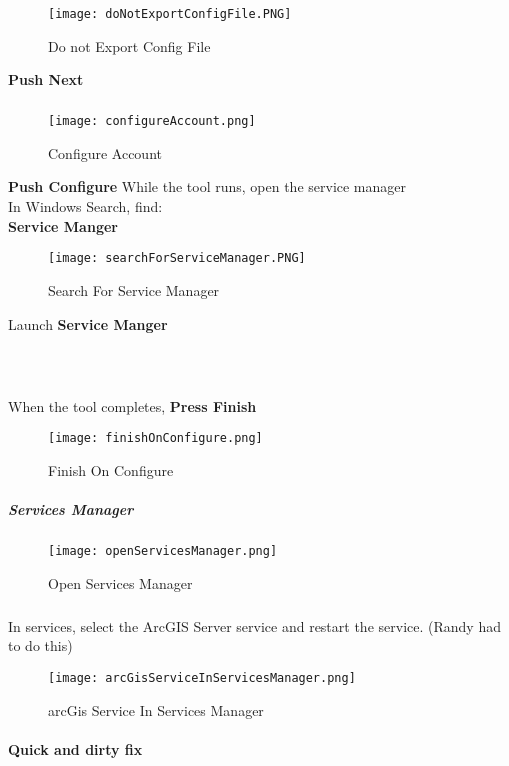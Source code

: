 \documentclass[class=book , crop=false, titlepage, twoside, multi={itemize, figure, verbatim}, float=false]{standalone}
\begin{document}
\begin{figure}[h!]
\centering
\texttt{[image: doNotExportConfigFile.PNG]}
\caption{Do not Export Config File}
\end{figure}
\noindent\textbf{\Large Push Next}
\subparagraph*{}
\begin{figure}[h!]
\centering
\texttt{[image: configureAccount.png]}
\caption{Configure Account}
\end{figure}
\noindent\textbf{\Large Push Configure}
\clearpage
\noindent While the tool runs, open the service manager\\
\noindent In Windows Search, find:\\
\textbf{Service Manger}
\begin{figure}[h!]
\centering
\texttt{[image: searchForServiceManager.PNG]}
\caption{Search For Service Manager}
\end{figure}
Launch \textbf{Service Manger}
\vspace{.2in}
\subparagraph*{\texorpdfstring{\\}{}}
\noindent When the tool completes, \textbf{\Large Press Finish}
\begin{figure}[h!]
\centering
\texttt{[image: finishOnConfigure.png]}
\caption{Finish On Configure}
\end{figure}
\clearpage
\subparagraph*{Services Manager}
\begin{figure}[h!]
\centering
\texttt{[image: openServicesManager.png]}
\caption{Open Services Manager}
\end{figure}
\subparagraph*{}
\noindent In services, select the ArcGIS Server service and restart the service.  (Randy had to do this)\\

\begin{figure}[h!]
\centering
\texttt{[image: arcGisServiceInServicesManager.png]}
\caption{arcGis Service In Services Manager}
\end{figure}


\clearpage


\paragraph*{Quick and dirty fix\texorpdfstring{\\}{}}
\end{document}
